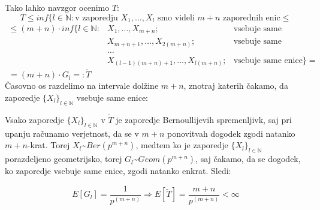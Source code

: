 \documentclass[12pt, a4paper]{article}
\begin{document}
Tako lahko navzgor ocenimo $T$:
$$T \leq inf\{ l \in \mathbb{N}: \textrm{v zaporedju } X_1, \dots, X_l \textrm{ smo videli } m+n \textrm{ zaporednih enic} \leq$$ 
$$
\begin{array} {lll} 
\leq (m+n)\cdot inf\{ l \in \mathbb{N}:& X_1, \dots, X_{m+n}; & \textrm{vsebuje same enice, ali} \\ 
&X_{m+n+1}, \dots, X_{2(m+n)};& \textrm{vsebuje same enice, ali}\\
&\dots \\
&X_{(l-1)(m+n)+1}, \dots, X_{l(m+n)}; & \textrm{vsebuje same enice}\}=
\end{array}$$
$~~= (m+n)\cdot G_l =: \widetilde{T}$\\

Časovno os razdelimo na intervale dolžine $m+n$, znotraj katerih čakamo, da zaporedje $\{X_l\}_{l \in \mathbb{N}}$ vsebuje same enice:
\begin{center}
\end{center}

Vsako zaporedje $\{X_l\}_{l \in \mathbb{N}}$ v $\widetilde{T}$ je zaporedje Bernoullijevih spremenljivk, saj pri upanju računamo verjetnost, da se v $m+n$ ponovitvah dogodek zgodi natanko $m+n$-krat. Torej $X_l$\textasciitilde $Ber(p^{m+n})$, medtem ko je zaporedje 
$\{X_l\}_{l \in \mathbb{N}}$ porazdeljeno geometrijsko, torej $G_l$\textasciitilde $Geom(p^{m+n})$, saj čakamo, da se dogodek, ko zaporedje vsebuje same enice, zgodi natanko enkrat. Sledi:

$$E[G_l]=\frac{1}{p^{(m+n)}} \Longrightarrow E[\widetilde{T}] = \frac{m+n}{p^{(m+n)}} < \infty$$

\newpage
\end{document}
